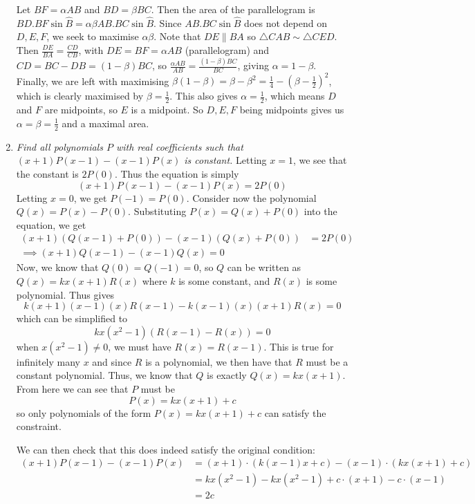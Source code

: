 \documentclass{article}
\begin{document}
\begin{enumerate}[1.]
Let $BF=\alpha AB$ and $BD=\beta BC$. Then the area of the parallelogram is $BD.BF\sin{\hat{B}} = \alpha \beta AB.BC\sin{\hat{B}}$. Since $AB.BC\sin{\hat{B}}$ does not depend on $D,E,F$, we seek to maximise $\alpha \beta$. Note that $DE\parallel BA$ so $\triangle CAB \sim \triangle CED$. Then $\frac{DE}{BA}=\frac{CD}{CB}$, with $DE=BF=\alpha AB$ (parallelogram) and $CD=BC-DB=(1-\beta)BC$, so $\frac{\alpha AB}{AB}=\frac{(1-\beta)BC}{BC}$, giving $\alpha = 1-\beta$. Finally, we are left with maximising $\beta (1-\beta) = \beta - \beta^2 = \frac{1}{4}-(\beta-\frac{1}{2})^2$, which is clearly maximised by $\beta=\frac{1}{2}$. This also gives $\alpha=\frac{1}{2}$, which means $D$ and $F$ are midpoints, so $E$ is a midpoint. So $D,E,F$ being midpoints gives us $\alpha=\beta=\frac{1}{2}$ and a maximal area.


\item %
{\itshape Find all polynomials $P$ with real coefficients such that $(x + 1)P(x - 1) - (x - 1)P(x)$ is constant.}
Letting $x = 1$, we see that the constant is $2P(0)$. Thus the equation is simply
$$(x + 1)P(x - 1) - (x - 1)P(x) = 2P(0) $$
Letting $x = 0$, we get $P(-1) = P(0)$. Consider now the polynomial $Q(x) = P(x) - P(0)$. Substituting $P(x) = Q(x) + P(0)$ into the equation, we get
\begin{align*}
  (x + 1)(Q(x - 1) + P(0)) - (x - 1)(Q(x) + P(0)) &= 2P(0) \\
  \implies (x + 1)Q(x - 1) - (x - 1)Q(x) = 0
\end{align*}
Now, we know that $Q(0) = Q(-1) = 0$, so $Q$ can be written as $Q(x) = kx(x + 1)R(x)$ where $k$ is some constant, and $R(x)$ is some polynomial. Thus gives 
$$k(x + 1)(x - 1)(x)R(x - 1) - k(x - 1)(x)(x + 1)R(x) = 0 $$
which can be simplified to
$$kx(x^2 - 1)(R(x - 1) - R(x)) = 0$$
when $x(x^2 - 1) \ne 0$, we must have $R(x) = R(x - 1)$. This is true for infinitely many $x$ and since $R$ is a polynomial, we then have that $R$ must be a constant polynomial. Thus, we know that $Q$ is exactly $Q(x) = kx(x + 1)$. From here we can see that $P$ must be
$$P(x) = kx(x + 1) + c$$
so only polynomials of the form $P(x) = kx(x + 1) + c$ can satisfy the constraint.

We can then check that this does indeed satisfy the original condition:
\begin{align*}
  (x + 1)P(x - 1) - (x - 1)P(x) &= (x + 1) \cdot (k(x - 1)x + c) - (x - 1) \cdot (kx(x + 1) + c) \\
  &= kx(x^2 - 1) - kx(x^2 - 1) + c \cdot (x + 1) - c \cdot (x - 1) \\
  &= 2c
\end{align*}


\end{enumerate}
\end{document}

